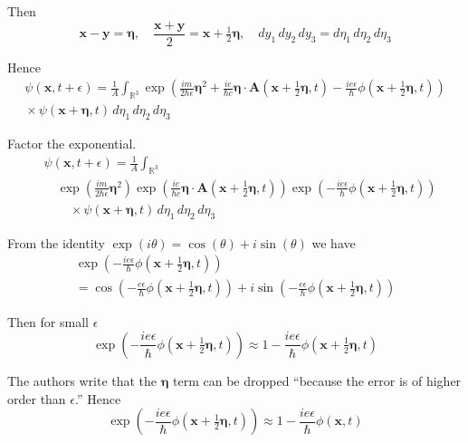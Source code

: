 \documentclass[12pt]{article}
\newcommand\INT{\int_{\mathbb R^3}}
\begin{document}
Then
\begin{equation*}
\mathbf x-\mathbf y=\boldsymbol\eta,\quad
\frac{\mathbf x+\mathbf y}{2}=\mathbf{x}+\tfrac{1}{2}\boldsymbol\eta,\quad
dy_1\,dy_2\,dy_3=d\eta_1\,d\eta_2\,d\eta_3
\end{equation*}

Hence
\begin{multline*}
\psi(\mathbf x,t+\epsilon)=
\frac{1}{A}\INT\exp
\left(
\frac{im}{2\hbar\epsilon}\boldsymbol\eta^2
+\frac{ie}{\hbar c}\boldsymbol\eta\cdot\mathbf A\left(\mathbf x+\tfrac{1}{2}\boldsymbol\eta,t\right)
-\frac{ie\epsilon}{\hbar}\phi\left(\mathbf x+\tfrac{1}{2}\boldsymbol\eta,t\right)
\right)
\\
{}\times\psi(\mathbf x+\boldsymbol\eta,t)
\,d\eta_1\,d\eta_2\,d\eta_3
\end{multline*}

Factor the exponential.
\begin{align*}
&\psi(\mathbf x,t+\epsilon)=
\frac{1}{A}\INT
\\
&\quad{}\exp\left(\frac{im}{2\hbar\epsilon}\boldsymbol\eta^2\right)
\exp\left(\frac{ie}{\hbar c}\boldsymbol\eta\cdot\mathbf A\left(\mathbf x+\tfrac{1}{2}\boldsymbol\eta,t\right)\right)
\exp\left(-\frac{ie\epsilon}{\hbar}\phi\left(\mathbf x+\tfrac{1}{2}\boldsymbol\eta,t\right)\right)
\\
&\quad\quad{}\times\psi(\mathbf x+\boldsymbol\eta,t)
\,d\eta_1\,d\eta_2\,d\eta_3
\tag{2}
\end{align*}

From the identity $\exp(i\theta)=\cos(\theta)+i\sin(\theta)$ we have
\begin{multline*}
\exp\left(-\frac{ie\epsilon}{\hbar}\phi\left(\mathbf x+\tfrac{1}{2}\boldsymbol\eta,t\right)\right)
\\
=\cos\left(-\frac{e\epsilon}{\hbar}\phi\left(\mathbf x+\tfrac{1}{2}\boldsymbol\eta,t\right)\right)
+i\sin\left(-\frac{e\epsilon}{\hbar}\phi\left(\mathbf x+\tfrac{1}{2}\boldsymbol\eta,t\right)\right)
\end{multline*}

Then for small $\epsilon$
\begin{equation*}
\exp\left(-\frac{ie\epsilon}{\hbar}\phi\left(\mathbf x+\tfrac{1}{2}\boldsymbol\eta,t\right)\right)
\approx
1-\frac{ie\epsilon}{\hbar}\phi\left(\mathbf x+\tfrac{1}{2}\boldsymbol\eta,t\right)
\end{equation*}

The authors write that the $\boldsymbol\eta$ term can be dropped
``because the error is of higher order than $\epsilon$.''
Hence
\begin{equation*}
\exp\left(-\frac{ie\epsilon}{\hbar}\phi\left(\mathbf x+\tfrac{1}{2}\boldsymbol\eta,t\right)\right)\approx
1-\frac{ie\epsilon}{\hbar}\phi\left(\mathbf x,t\right)
\tag{3}
\end{equation*}
\end{document}
